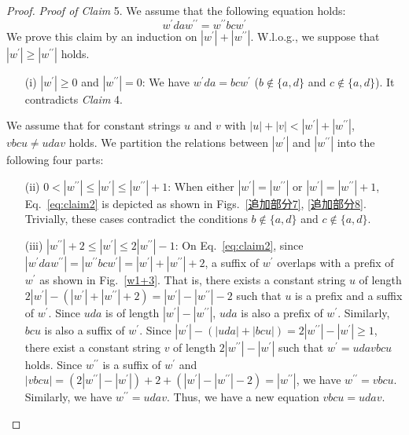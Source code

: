 \begin{proof}
  \smallskip
  
  \noindent
  \textit{Proof of Claim} 5.
  We assume that the following equation holds:
  \begin{equation}
  w^{\prime}daw^{\prime\prime} = w^{\prime\prime}bcw^{\prime}\label{eq:claim2}
  \end{equation}
  We prove this claim by an induction on $|w^{\prime}| + |w^{\prime\prime}|$.
  W.l.o.g., we suppose that $|w^{\prime}| \geq |w^{\prime\prime}|$ holds.
  \begin{enumerate}
    \item[(i)] $|w^{\prime}| \geq 0$ and $|w^{\prime\prime}|=0$:
    We have $w^{\prime}da = bcw^{\prime}$ ($b \not\in \{a,d\}$ and $c \not\in \{a,d\}$).
    It contradicts \textit{Claim} 4.
  \end{enumerate}
  We assume that for constant strings $u$ and $v$ with $|u| + |v| < |w^{\prime}| + |w^{\prime\prime}|$, $vbcu \not= udav$ holds.
  We partition the relations between $|w^{\prime}|$ and $|w^{\prime\prime}|$ into the following four parts:
  \begin{enumerate}
  \item[(ii)] $0 < |w^{\prime\prime}| \le |w^{\prime}| \le |w^{\prime\prime}|+1$:
  When either $|w^{\prime}|=|w^{\prime\prime}|$ or $|w^{\prime}|=|w^{\prime\prime}|+1$, Eq.~\ref{eq:claim2} is depicted as shown in Figs.~\ref{追加部分7}, \ref{追加部分8}. Trivially, these cases contradict the conditions $b \not\in \{a,d\}$ and $c \not\in \{a,d\}$.
  \item[(iii)] $|w^{\prime\prime}|+2 \le |w^{\prime}| \le 2|w^{\prime\prime}| - 1$:
  On Eq.~\ref{eq:claim2}, since $|w^{\prime}daw^{\prime\prime}| = |w^{\prime\prime}bcw^{\prime}| = |w^{\prime}| + |w^{\prime\prime}| + 2$, a suffix of $w^{\prime}$ overlaps with a prefix of $w^{\prime}$ as shown in Fig.~\ref{w1+3}. That is, there exists a constant string $u$ of length $2|w^{\prime}| - (|w^{\prime}| + |w^{\prime\prime}| + 2) = |w^{\prime}| - |w^{\prime\prime}| - 2$ such that $u$ is a prefix and a suffix of $w^{\prime}$.
  Since $uda$ is of length $|w^{\prime}| - |w^{\prime\prime}|$, $uda$ is also a prefix of $w^{\prime}$. Similarly, $bcu$ is also a suffix of $w^{\prime}$.
  Since $|w^{\prime}| - (|uda| + |bcu|) = 2|w^{\prime\prime}| - |w^{\prime}| \ge 1$, there exist a constant string $v$ of length $2|w^{\prime\prime}| - |w^{\prime}|$ such that $w^{\prime} = udavbcu$ holds. Since $w^{\prime\prime}$ is a suffix of $w^{\prime}$ and $|vbcu| = (2|w^{\prime\prime}| - |w^{\prime}|) + 2 + (|w^{\prime}| - |w^{\prime\prime}| - 2) = |w^{\prime\prime}|$, we have $w^{\prime\prime} = vbcu$. Similarly, we have $w^{\prime\prime} = udav$. Thus, we have a new equation $vbcu = udav$.

\end{enumerate}
\end{proof}
